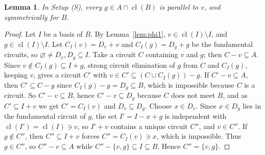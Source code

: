 \documentclass[11pt,a4paper]{article}
\theoremstyle{plain}
\newtheorem{lemma}[theorem]{Lemma}
\theoremstyle{definition}
\newcommand{\cl}{\operatorname{cl}}
\begin{document}
\begin{lemma}\label{lem:A}
In Setup (S), every $g\in A\cap\cl(B)$ is parallel to $v$, and symmetrically for $B$.
\end{lemma}
\begin{proof}
Let $I$ be a basis of $B$. By Lemma~\ref{lem:phi1}, $v\in\cl(I)\setminus I$, and $g\in\cl(I)\setminus I$. Let $C_I(v)=D_v+v$ and $C_I(g)=D_g+g$ be the fundamental circuits, so $\varnothing\ne D_v,D_g\subseteq I$. Take a circuit $C$ containing $v$ and $g$; then $C-v\subseteq A$. Since $v\notin C_I(g)\subseteq I+g$, strong circuit elimination of $g$ from $C$ and $C_I(g)$, keeping $v$, gives a circuit $C'$ with $v\in C'\subseteq(C\cup C_I(g))-g$. If $C'-v\subseteq A$, then $C'\subseteq C-g$ since $C_I(g)-g=D_g\subseteq B$, which is impossible because $C$ is a circuit. So $C'-v\subseteq B$, hence $C'-v\subseteq D_g$ because $C$ does not meet $B$, and as $C'\subseteq I+v$ we get $C'=C_I(v)$ and $D_v\subseteq D_g$. Choose $x\in D_v$. Since $x\in D_g$ lies in the fundamental circuit of $g$, the set $I'=I-x+g$ is independent with $\cl(I')=\cl(I)\ni v$, so $I'+v$ contains a unique circuit $C''$, and $v\in C''$. If $g\notin C''$, then $C''\subseteq I+v$ forces $C''=C_I(v)\ni x$, which is impossible. Thus $g\in C''$, so $C''-v\subseteq A$ while $C''-\{v,g\}\subseteq I\subseteq B$. Hence $C''=\{v,g\}$.
\end{proof}
\end{document}
